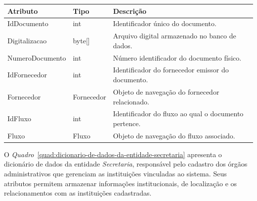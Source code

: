\begin{quadro}[H]
\caption[Dicionário de dados da entidade Documento]{Dicionário de dados da entidade Documento}
\label{quad:dicionario-de-dados-da-entidade-documento}

\begin{tabular}{|p{}|p{}|p{}|}
\hline
\textbf{Atributo} & \textbf{Tipo} & \textbf{Descrição} \\ 
\hline
IdDocumento & int & Identificador único do documento. \\ 
\hline
Digitalizacao & byte[] & Arquivo digital armazenado no banco de dados. \\ 
\hline
NumeroDocumento & int & Número identificador do documento físico. \\ 
\hline
IdFornecedor & int & Identificador do fornecedor emissor do documento. \\ 
\hline
Fornecedor & Fornecedor & Objeto de navegação do fornecedor relacionado. \\ 
\hline
IdFluxo & int & Identificador do fluxo ao qual o documento pertence. \\ 
\hline
Fluxo & Fluxo & Objeto de navegação do fluxo associado. \\ 
\hline
\end{tabular}


\end{quadro}


O \textit{Quadro}~\ref{quad:dicionario-de-dados-da-entidade-secretaria} apresenta o dicionário de dados da entidade \textit{Secretaria}, responsável pelo cadastro dos órgãos administrativos que gerenciam as instituições vinculadas ao sistema. Seus atributos permitem armazenar informações institucionais, de localização e os relacionamentos com as instituições cadastradas.

